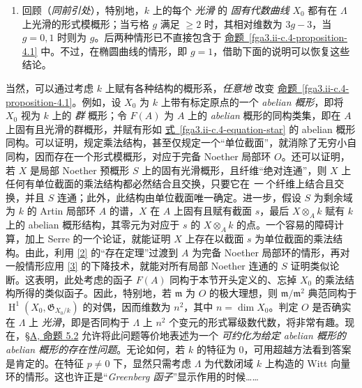 \begin{remarks}{}
\begin{enumerate}
    \item{}回顾（\emph{同前引处}），特别地，\(k\) 上的每个 \emph{光滑} 的 \emph{固有代数曲线} \(X_0\) 都有在 \(\Lambda \) 上光滑的形式模概形；当亏格 \(g\) 满足 \(\geqslant 2\) 时，其相对维数为 \(3g-3\)，当 \(g=0,1\) 时则为 \(g\)。后两种情形已不直接包含于 \hyperref[fga3.ii-c.4-proposition-4.1]{命题~\ref*{fga3.ii-c.4-proposition-4.1}} 中。不过，在椭圆曲线的情形，即 \(g=1\)，借助下面的说明可以恢复这些结论。\end{enumerate}\end{remarks}\par{}当然，可以通过考虑 \(k\) 上赋有各种结构的概形系，\emph{任意地} 改变 \hyperref[fga3.ii-c.4-proposition-4.1]{命题~\ref*{fga3.ii-c.4-proposition-4.1}}。例如，设 \(X_0\) 为 \(k\) 上带有标定原点的一个 \emph{abelian 概形}，即将 \(X_0\) 视为 \(k\) 上的 \emph{群} 概形；令 \(F(A)\) 为 \(A\) 上的 \emph{abelian} 概形的同构类集，即在 \(A\) 上固有且光滑的群概形，并赋有形如 \hyperref[fga3.ii-c.4-equation-star]{式~\ref*{fga3.ii-c.4-equation-star}} 的 abelian 概形同构。可以证明，规定乘法结构，甚至仅规定一个“单位截面”，就消除了无穷小自同构，因而存在一个形式模概形，对应于完备 Noether 局部环 \(O\)。还可以证明，若 \(X\) 是局部 Noether 预概形 \(S\) 上的固有光滑概形，且纤维“绝对连通”，则 \(X\) 上任何有单位截面的乘法结构都必然结合且交换，只要它在 \emph{一} 个纤维上结合且交换，并且 \(S\) 连通；此外，此结构由单位截面唯一确定。进一步，假设 \(S\) 为剩余域为 \(k\) 的 Artin 局部环 \(A\) 的谱，\(X\) 在 \(A\) 上固有且赋有截面 \(s\)，最后 \(X\otimes _A k\) 赋有 \(k\) 上的 abelian 概形结构，其零元为对应于 \(s\) 的 \(X\otimes _A k\) 的点。一个容易的障碍计算，加上 Serre 的一个论证，就能证明 \(X\) 上存在以截面 \(s\) 为单位截面的乘法结构。由此，利用 \hyperref[fga2]{[2]} 的“存在定理”过渡到 \(A\) 为完备 Noether 局部环的情形，再对一般情形应用 \hyperref[fga3.i]{[3]} 的下降技术，就能对所有局部 Noether 连通的 \(S\) 证明类似论断。这表明，此处考虑的函子 \(F(A)\) 同构于本节开头定义的、忘掉 \(X_0\) 的乘法结构所得的类似函子。因此，特别地，若 \(\mathfrak {m}\) 为 \(O\) 的极大理想，则 \(\mathfrak {m}/\mathfrak {m}^2\) 典范同构于 \(\operatorname {H}^1(X_0,\mathfrak {G}_{X_0/k})\) 的对偶，因而维数为 \(n^2\)，其中 \(n=\dim  X_0\)。判定 \(O\) 是否确实在 \(\Lambda \) 上 \emph{光滑}，即是否同构于 \(\Lambda \) 上 \(n^2\) 个变元的形式幂级数代数，将非常有趣。现在，\hyperref[fga3.ii-a.5-proposition-5.2]{§A, 命题 5.2} 允许将此问题等价地表述为一个 \emph{可约化为给定 abelian 概形的 abelian 概形的存在性问题}。无论如何，若 \(k\) 的特征为 \(0\)，可用超越方法看到答案是肯定的。在特征 \(p\neq 0\) 下，显然只需考虑 \(\Lambda \) 为代数闭域 \(k\) 上构造的 Witt 向量环的情形。这也许正是“\emph{Greenberg 函子}”显示作用的时候……
